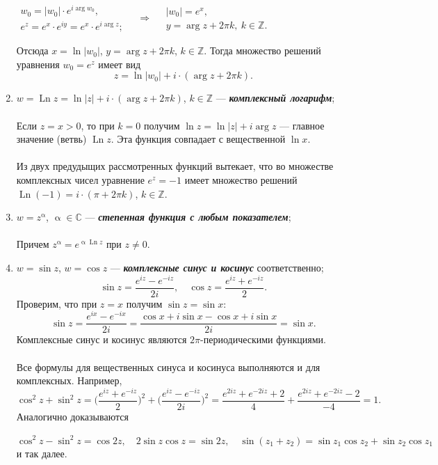 \documentclass[a4paper, 12pt]{article}
\newcommand{\Cm}{\mathbb{C}}
\newcommand{\Z}{\mathbb{Z}}
\renewcommand{\alpha}{\upalpha}
\newcommand{\Ln}{\operatorname{Ln}}
\newcommand\ef[1]{e^{i#1}}
\begin{document}
\begin{enumerate}
	\begin{center}
		$\begin{matrix}
			w_0 = |w_0|\cdot e^{i\arg w_0},\\
			e^z = e^x\cdot e^{iy} = e^x \cdot \ef{\arg z};
		\end{matrix}\quad \Longrightarrow\quad  \begin{matrix}
		|w_0|=e^x,\\
		y = \arg z + 2\pi k,\ k\in \Z.
	\end{matrix}$
	\end{center}
Отсюда $x = \ln|w_0|$, $y = \arg z + 2\pi k$, $k\in\Z$. Тогда множество решений уравнения $w_0 = e^z$ имеет вид $$z = \ln |w_0|+i\cdot (\arg z +2\pi k).$$
\item $w = \Ln z = \ln|z| + i\cdot (\arg z + 2\pi k)$, $k\in \Z$ --- \textbf{\textit{комплексный логарифм}};\\\\
Если $z = x > 0$, то при $k = 0$ получим $\ln z = \ln |z| + i\arg z$ --- главное значение (ветвь) $\Ln z$. Эта функция совпадает с вещественной $\ln x$.\\\\
Из двух предудыщих рассмотренных функций вытекает, что во множестве комплексных чисел уравнение $e^z = -1$ имеет множество решений $\Ln(-1) = i\cdot (\pi+ 2\pi k)$, $k\in \Z$.
\item $w = z^\alpha$, $\alpha \in \Cm$ --- \textbf{\textit{степенная функция с любым показателем}};\\\\
Причем $z ^\alpha = e^{\alpha \Ln z}$ при $z \ne 0$.
\item $w = \sin z$, $w = \cos z$ --- \textbf{\textit{комплексные синус и косинус}} соответственно;
$$\sin z = \dfrac{e^{iz} - e^{-iz}}{2i},\quad \cos z = \dfrac{e^{iz} + e^{-iz}}{2}.$$
Проверим, что при $z = x$ получим $\sin z = \sin x$:
$$\sin z = \dfrac{e^{ix} - e^{-ix}}{2i}=\dfrac{\cos x + i\sin x - \cos x + i\sin x}{2i} = \sin x.$$
Комплексные синус и косинус являются $2\pi$-периодическими функциями.\\\\
Все формулы для вещественных синуса и косинуса выполняются и для комплексных. Например, $$\cos^2 z + \sin^2z = \Big(\dfrac{e^{iz} + e^{-iz}}{2}\Big)^2 + \Big(\dfrac{e^{iz} - e^{-iz}}{2i}\Big)^2 = \dfrac{e^{2iz} + e^{-2iz} + 2}{4} + \dfrac{e^{2iz} + e^{-2iz} -2}{-4} = 1.$$
Аналогично доказываются 
\begin{center}
	$\cos ^2z -\sin^2z = \cos 2z,\quad 2\sin z\cos z = \sin2z,\quad \sin(z_1 + z_2) = \sin z_1 \cos z_2 + \sin z_2 \cos z_1$ и так далее.
\end{center}
\end{enumerate}
\end{document}
